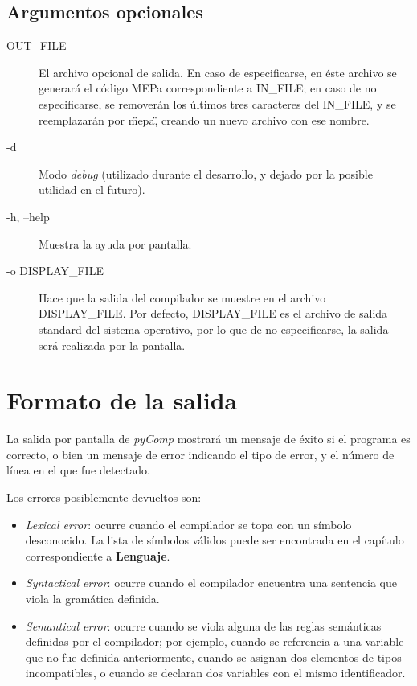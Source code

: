 \documentclass[a4paper,oneside]{report}
\begin{document}
\subsection*{Argumentos opcionales}

\begin{description}
	\item[\ttfamily OUT\_FILE] El archivo opcional de salida. En caso de especificarse, en éste archivo se generará el código MEPa correspondiente a {\ttfamily IN\_FILE}; en caso de no especificarse, se removerán los últimos tres caracteres del {\ttfamily IN\_FILE}, y se reemplazarán por \"mepa\", creando un nuevo archivo con ese nombre.
	\item[\ttfamily -d] Modo \textit{debug} (utilizado durante el desarrollo, y dejado por la posible utilidad en el futuro).
	\item[\ttfamily -h, --help] Muestra la ayuda por pantalla.
	\item[\ttfamily -o DISPLAY\_FILE] Hace que la salida del compilador se muestre en el archivo {\ttfamily DISPLAY\_FILE}. Por defecto, {\ttfamily DISPLAY\_FILE} es el archivo de salida standard del sistema operativo, por lo que de no especificarse, la salida será realizada por la pantalla.
\end{description}

\section{Formato de la salida}
La salida por pantalla de \emph{pyComp} mostrará un mensaje de éxito si el programa es correcto, o bien un mensaje de error indicando el tipo de error, y el número de línea en el que fue detectado.

Los errores posiblemente devueltos son:

\begin{itemize}
  \item \emph{Lexical error}: ocurre cuando el compilador se topa con un símbolo desconocido. La lista de símbolos válidos puede ser encontrada en el capítulo correspondiente a \textbf{Lenguaje}.
  \item \emph{Syntactical error}: ocurre cuando el compilador encuentra una sentencia que viola la gramática definida.
  \item \emph{Semantical error}: ocurre cuando se viola alguna de las reglas semánticas definidas por el compilador; por ejemplo, cuando se referencia a una variable que no fue definida anteriormente, cuando se asignan dos elementos de tipos incompatibles, o cuando se declaran dos variables con el mismo identificador.
\end{itemize}
\end{document}
